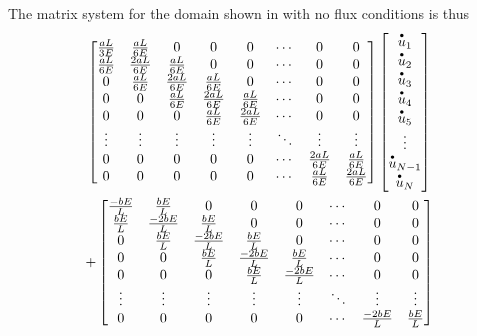The matrix system for the domain shown in  with no flux conditions is thus
\begin{multline}
  \begin{bmatrix}
    \frac{aL}{3E} & \frac{aL}{6E} & 0 & 0 & 0 & \cdots & 0 & 0 \\
    \frac{aL}{6E} & \frac{2aL}{6E} &  \frac{aL}{6E} & 0 & 0 & \cdots & 0 & 0 \\
    0 & \frac{aL}{6E} & \frac{2aL}{6E} &  \frac{aL}{6E} & 0 & \cdots & 0 & 0 \\
    0 & 0 & \frac{aL}{6E} & \frac{2aL}{6E} &  \frac{aL}{6E} & \cdots & 0 & 0 \\
    0 & 0 & 0 & \frac{aL}{6E} & \frac{2aL}{6E} & \cdots & 0 & 0 \\
    \vdots & \vdots & \vdots & \vdots & \vdots & \ddots & \vdots & \vdots \\
    0 & 0 & 0 & 0 & 0 & \cdots & \frac{2aL}{6E} & \frac{aL}{6E} \\
    0 & 0 & 0 & 0 & 0 & \cdots & \frac{aL}{6E} & \frac{2aL}{6E} \\
  \end{bmatrix} \begin{bmatrix}
     \stackrel{\scriptscriptstyle \bullet}{u} _{1} \\
     \stackrel{\scriptscriptstyle \bullet}{u} _{2} \\
     \stackrel{\scriptscriptstyle \bullet}{u} _{3} \\
     \stackrel{\scriptscriptstyle \bullet}{u} _{4} \\
     \stackrel{\scriptscriptstyle \bullet}{u} _{5} \\
    \vdots \\
     \stackrel{\scriptscriptstyle \bullet}{u} _{N-1} \\
     \stackrel{\scriptscriptstyle \bullet}{u} _{N} \\
  \end{bmatrix} \\
  + \begin{bmatrix}
    \frac{-bE}{L} & \frac{bE}{L} & 0 & 0 & 0 & \cdots & 0 & 0 \\
    \frac{bE}{L} & \frac{-2bE}{L} &  \frac{bE}{L} & 0 & 0 & \cdots & 0 & 0 \\
    0 & \frac{bE}{L} & \frac{-2bE}{L} &  \frac{bE}{L} & 0 & \cdots & 0 & 0 \\
    0 & 0 & \frac{bE}{L} & \frac{-2bE}{L} &  \frac{bE}{L} & \cdots & 0 & 0 \\
    0 & 0 & 0 & \frac{bE}{L} & \frac{-2bE}{L} & \cdots & 0 & 0 \\
    \vdots & \vdots & \vdots & \vdots & \vdots & \ddots & \vdots & \vdots \\
    0 & 0 & 0 & 0 & 0 & \cdots & \frac{-2bE}{L} & \frac{bE}{L} \\

\end{bmatrix}
\end{multline}
